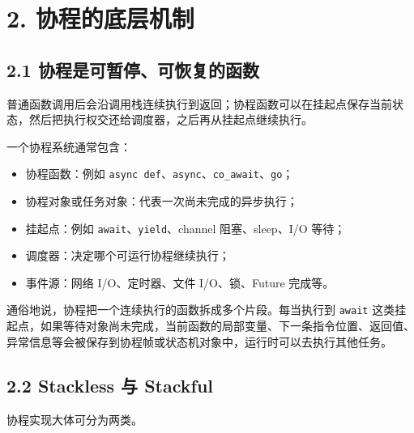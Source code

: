 \documentclass[
  11pt,
  a4paper,
]{article}
\providecommand{\tightlist}{%
  \setlength{\itemsep}{0pt}\setlength{\parskip}{0pt}}
\begin{document}
\section{2.
协程的底层机制}\label{ux534fux7a0bux7684ux5e95ux5c42ux673aux5236}

\subsection{2.1
协程是可暂停、可恢复的函数}\label{ux534fux7a0bux662fux53efux6682ux505cux53efux6062ux590dux7684ux51fdux6570}

普通函数调用后会沿调用栈连续执行到返回；协程函数可以在挂起点保存当前状态，然后把执行权交还给调度器，之后再从挂起点继续执行。

一个协程系统通常包含：

\begin{itemize}
\tightlist
\item
  协程函数：例如
  \texttt{async\ def}、\texttt{async}、\texttt{co\_await}、\texttt{go}；
\item
  协程对象或任务对象：代表一次尚未完成的异步执行；
\item
  挂起点：例如 \texttt{await}、\texttt{yield}、channel 阻塞、sleep、I/O
  等待；
\item
  调度器：决定哪个可运行协程继续执行；
\item
  事件源：网络 I/O、定时器、文件 I/O、锁、Future 完成等。
\end{itemize}

通俗地说，协程把一个连续执行的函数拆成多个片段。每当执行到
\texttt{await}
这类挂起点，如果等待对象尚未完成，当前函数的局部变量、下一条指令位置、返回值、异常信息等会被保存到协程帧或状态机对象中，运行时可以去执行其他任务。

\subsection{2.2 Stackless 与 Stackful}\label{stackless-ux4e0e-stackful}

协程实现大体可分为两类。
\end{document}
